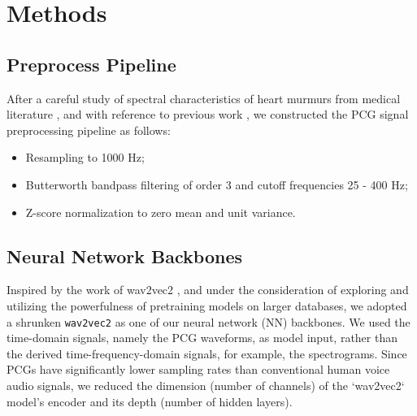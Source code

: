\section{Methods}
\label{sec:methods}




\subsection{Preprocess Pipeline}
\label{subsec:preproc}

After a careful study of spectral characteristics of heart murmurs from medical literature \cite{Noponen_2007}, and with reference to previous work \cite{Schmidt_2010}, we constructed the PCG signal preprocessing pipeline as follows:
\begin{itemize}
    \item Resampling to 1000 Hz;
    \item Butterworth bandpass filtering of order 3 and cutoff frequencies 25 - 400 Hz;
    \item Z-score normalization to zero mean and unit variance.
\end{itemize}

\subsection{Neural Network Backbones}
\label{subsec:backbone}

Inspired by the work of wav2vec2 \cite{baevski2020wav2vec}, and under the consideration of exploring and utilizing the powerfulness of pretraining models on larger databases, we adopted a shrunken \texttt{wav2vec2} as one of our neural network (NN) backbones. We used the time-domain signals, namely the PCG waveforms, as model input, rather than the derived time-frequency-domain signals, for example, the spectrograms. Since PCGs have significantly lower sampling rates than conventional human voice audio signals, we reduced the dimension (number of channels) of the `wav2vec2` model's encoder and its depth (number of hidden layers).

